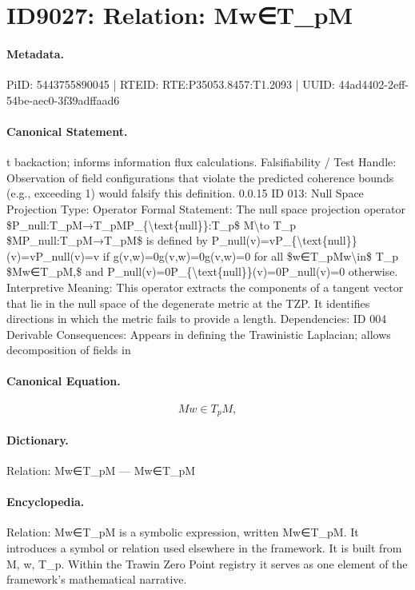 \section*{ID9027: Relation: Mw∈T\_pM}
\paragraph{Metadata.}
PiID: 5443755890045 | RTEID: RTE:P35053.8457:T1.2093 | UUID: 44ad4402-2eff-54be-aec0-3f39adffaad6

\paragraph{Canonical Statement.}
t backaction; informs information flux calculations. Falsifiability / Test Handle: Observation of field configurations that violate the predicted coherence bounds (e.g., exceeding 1) would falsify this definition. 0.0.15 ID 013: Null Space Projection Type: Operator Formal Statement: The null space projection operator \$P\_null:T\_pM→T\_pMP\_\{\textbackslash{}text\{null\}\}:T\_p\$ M\textbackslash{}to T\_p \$MP\_null:T\_pM→T\_pM\$ is defined by P\_null(v)=vP\_\{\textbackslash{}text\{null\}\}(v)=vP\_null(v)=v if g(v,w)=0g(v,w)=0g(v,w)=0 for all \$w∈T\_pMw\textbackslash{}in\$ T\_p \$Mw∈T\_pM,\$ and P\_null(v)=0P\_\{\textbackslash{}text\{null\}\}(v)=0P\_null(v)=0 otherwise. Interpretive Meaning: This operator extracts the components of a tangent vector that lie in the null space of the degenerate metric at the TZP. It identifies directions in which the metric fails to provide a length. Dependencies: ID 004 Derivable Consequences: Appears in defining the Trawinistic Laplacian; allows decomposition of fields in

\paragraph{Canonical Equation.}
\[
Mw∈T_pM,
\]

\paragraph{Dictionary.}
Relation: Mw∈T\_pM — Mw∈T\_pM

\paragraph{Encyclopedia.}
Relation: Mw∈T\_pM is a symbolic expression, written Mw∈T\_pM. It introduces a symbol or relation used elsewhere in the framework. It is built from M, w, T\_p. Within the Trawin Zero Point registry it serves as one element of the framework's mathematical narrative.
